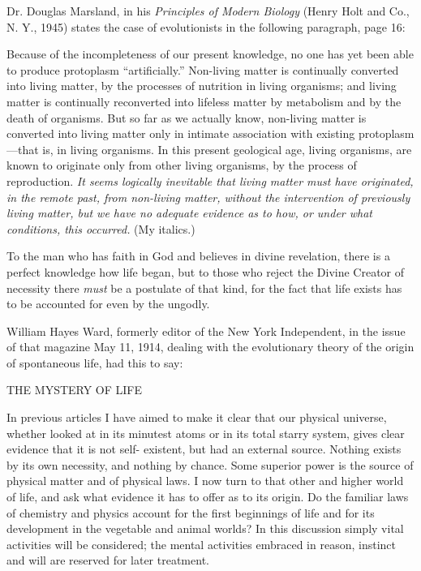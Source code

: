 Dr. Douglas Marsland, in his \textit{Principles of Modern Biology} (Henry Holt and Co., N. Y.,
1945) states the case of evolutionists in the following paragraph, page 16:

Because of the incompleteness of our present knowledge, no one has yet been able to
produce protoplasm ``artificially.'' Non-living matter is continually converted into living
matter, by the processes of nutrition in living organisms; and living matter is continually
reconverted into lifeless matter by metabolism and by the death of organisms. But so far as
we actually know, non-living matter is converted into living matter only in intimate
association with existing protoplasm—that is, in living organisms. In this present geological
age, living organisms, are known to originate only from other living organisms, by the
process of reproduction. \textit{It seems logically inevitable that living matter must have originated,
in the remote past, from non-living matter, without the intervention of previously living
matter, but we have no adequate evidence as to how, or under what conditions, this
occurred.} (My italics.)

To the man who has faith in God and believes in divine revelation, there is a perfect
knowledge how life began, but to those who reject the Divine Creator of necessity there \textit{must}
be a postulate of that kind, for the fact that life exists has to be accounted for even by the
ungodly.

William Hayes Ward, formerly editor of the New York Independent, in the issue of that
magazine May 11, 1914, dealing with the evolutionary theory of the origin of spontaneous
life, had this to say:

THE MYSTERY OF LIFE

In previous articles I have aimed to make it clear that our physical universe, whether looked
at in its minutest atoms or in its total starry system, gives clear evidence that it is not self-
existent, but had an external source. Nothing exists by its own necessity, and nothing by
chance. Some superior power is the source of physical matter and of physical laws. I now
turn to that other and higher world of life, and ask what evidence it has to offer as to its
origin. Do the familiar laws of chemistry and physics account for the first beginnings of life
and for its development in the vegetable and animal worlds? In this discussion simply vital
activities will be considered; the mental activities embraced in reason, instinct and will are
reserved for later treatment.

